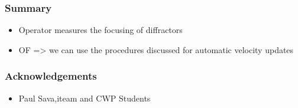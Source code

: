 \begin{frame}\frametitle{Summary}
\begin{itemize}
  \item Operator measures the focusing of diffractors 
  \item OF => we can use the procedures discussed for automatic velocity updates
\end{itemize}
 
\end{frame}
\begin{frame}\frametitle{Acknowledgements}
\begin{itemize}
  \item Paul Sava,iteam and CWP Students
\end{itemize}
 
\end{frame}
